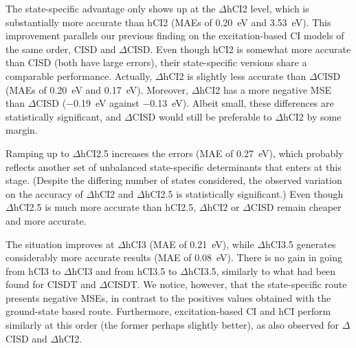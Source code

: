 \documentclass[aip,jcp,reprint,noshowkeys,superscriptaddress]{revtex4-1}
\begin{document}

The state-specific advantage only shows up at the $\Delta$hCI2 level, which is substantially more accurate than hCI2 (MAEs of \SI{0.20}{\eV} and \SI{3.53}{\eV}).
This improvement parallels our previous finding on the excitation-based CI models of the same order, CISD and $\Delta$CISD. \cite{Kossoski_2023}
Even though hCI2 is somewhat more accurate than CISD (both have large errors), their state-specific versions share a comparable performance.
Actually, $\Delta$hCI2 is slightly less accurate than $\Delta$CISD (MAEs of \SI{0.20}{\eV} and \SI{0.17}{\eV}).
Moreover, $\Delta$hCI2 has a more negative MSE than $\Delta$CISD (\SI{-0.19}{\eV} against \SI{-0.13}{\eV}).
Albeit small, these differences are statistically significant, and $\Delta$CISD would still be preferable to $\Delta$hCI2 by some margin.

Ramping up to $\Delta$hCI2.5 increases the errors (MAE of \SI{0.27}{\eV}),
which probably reflects another set of unbalanced state-specific determinants that enters at this stage.
(Despite the differing number of states considered, the observed variation on the accuracy of $\Delta$hCI2 and $\Delta$hCI2.5 is statistically significant.)
Even though $\Delta$hCI2.5 is much more accurate than hCI2.5, $\Delta$hCI2 or $\Delta$CISD remain cheaper and more accurate.

The situation improves at $\Delta$hCI3 (MAE of \SI{0.21}{\eV}),
while $\Delta$hCI3.5 generates considerably more accurate results (MAE of \SI{0.08}{\eV}).
There is no gain in going from hCI3 to $\Delta$hCI3 and from hCI3.5 to $\Delta$hCI3.5,
similarly to what had been found for CISDT and $\Delta$CISDT. \cite{Kossoski_2023}
We notice, however, that the state-specific route presents negative MSEs, in contrast to the positives values obtained with the ground-state based route.
Furthermore, excitation-based CI and hCI perform similarly at this order (the former perhaps slightly better),
as also observed for $\Delta$CISD and $\Delta$hCI2.


\end{document}
